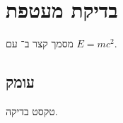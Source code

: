 \def\lakitdocumentclass{article}
\def\lakitclassoptions{11pt,a5paper}
\def\lakitgeometryoptions{margin=1.6cm,headheight=14pt}
\def\lakitlinespread{1.15}
\def\lakittocdepth{2}
\def\lakitsecnumdepth{1}


\section{בדיקת מעטפת}
מסמך קצר ב־ עם $E=mc^2$.
\subsection{עומק}
טקסט בדיקה.

